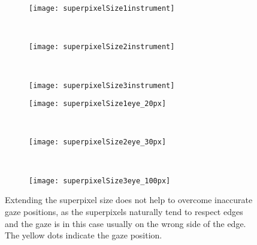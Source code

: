 \begin{figure}[ht]
	\centering
	\begin{subfigure}[h]{0.31\textwidth}
	      \texttt{[image: superpixelSize1instrument]}
	\end{subfigure}
	~
	\begin{subfigure}[h]{0.31\textwidth}
		\texttt{[image: superpixelSize2instrument]}	
	\end{subfigure}
	~
	\begin{subfigure}[h]{0.31\textwidth}
		\texttt{[image: superpixelSize3instrument]}	
	\end{subfigure}	
	
	\vspace{3mm}
	\begin{subfigure}[h]{0.31\textwidth}
	      \texttt{[image: superpixelSize1eye\_20px]}
	\end{subfigure}
	~
	\begin{subfigure}[h]{0.31\textwidth}
		\texttt{[image: superpixelSize2eye\_30px]}	
	\end{subfigure}
	~
	\begin{subfigure}[h]{0.31\textwidth}
		\texttt{[image: superpixelSize3eye\_100px]}	
	\end{subfigure}	
	\caption{Extending the superpixel size does not help to overcome inaccurate gaze positions, as the superpixels naturally tend to respect edges and the gaze is in this case usually on the wrong side of the edge. The yellow dots indicate the gaze position.}
	\label{fig:gazeOffSuperpixelSize}
\end{figure}

